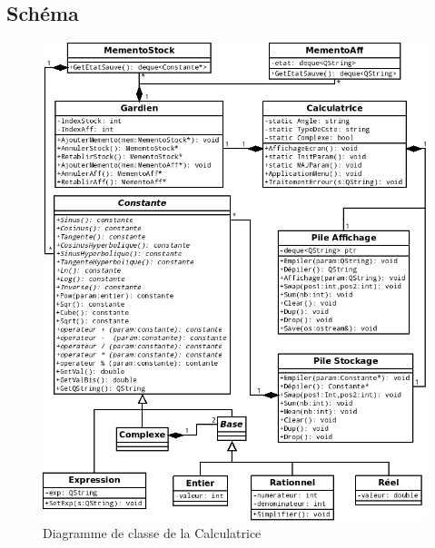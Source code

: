 \documentclass[a4paper,12pt]{report}
\begin{document}
		\subsection{Schéma}
			\begin{figure}[H]
				\center
				\includegraphics[width=16cm]{UMLProjetLO21v3.png}
				\caption{Diagramme de classe de la Calculatrice}
			\end{figure}
\end{document}
